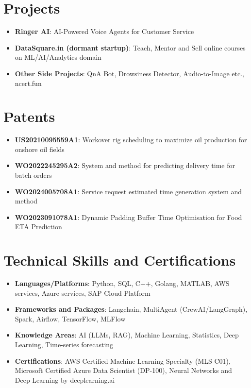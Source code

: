 \documentclass[letterpaper,11pt]{article}
\newcommand{\resumeItem}[2]{
  \item\small{
    \textbf{#1}{: #2 \vspace{-2pt}}
  }
}
\newcommand{\resumeSubItem}[2]{\resumeItem{#1}{#2}\vspace{-4pt}}
\newcommand{\resumeSubHeadingListStart}{\begin{itemize}[leftmargin=*]}
\newcommand{\resumeSubHeadingListEnd}{\end{itemize}}
\begin{document}
\section{Projects}
  \resumeSubHeadingListStart
    \resumeSubItem{Ringer AI}{AI-Powered Voice Agents for Customer Service}
    \resumeSubItem{DataSquare.in (dormant startup)}{Teach, Mentor and Sell online courses on ML/AI/Analytics domain}
    \resumeSubItem{Other Side Projects}{QnA Bot, Drowsiness Detector, Audio-to-Image etc., ncert.fun}
  \resumeSubHeadingListEnd

\section{Patents}
  \resumeSubHeadingListStart
    \resumeSubItem{US20210095559A1}{Workover rig scheduling to maximize oil production for onshore oil fields}
    \resumeSubItem{WO2022245295A2}{System and method for predicting delivery time for batch orders}
    \resumeSubItem{WO2024005708A1}{Service request estimated time generation system and method}
    \resumeSubItem{WO2023091078A1}{Dynamic Padding Buffer Time Optimisation for Food ETA Prediction}
  \resumeSubHeadingListEnd

\section{Technical Skills and Certifications}
  \resumeSubHeadingListStart
    \resumeSubItem{Languages/Platforms}{Python, SQL, C++, Golang, MATLAB, AWS services, Azure services, SAP Cloud Platform}
    \resumeSubItem{Frameworks and Packages}{Langchain, MultiAgent (CrewAI/LangGraph), Spark, Airflow, TensorFlow, MLFlow}
    \resumeSubItem{Knowledge Areas}{AI (LLMs, RAG), Machine Learning, Statistics, Deep Learning, Time-series forecasting}
    \resumeSubItem{Certifications}{AWS Certified Machine Learning Specialty (MLS-C01), Microsoft Certified Azure Data Scientist (DP-100), Neural Networks and Deep Learning by deeplearning.ai}
  \resumeSubHeadingListEnd
\end{document}
